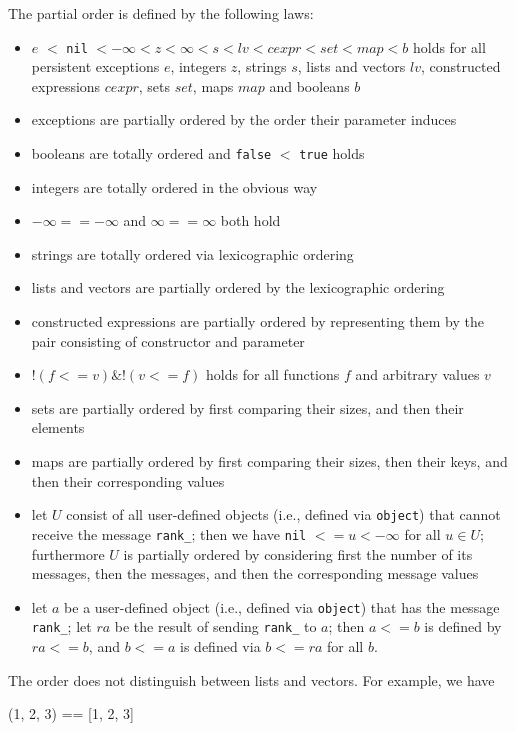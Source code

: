 \documentclass[11pt]{amsart}
\newcommand{\babelsrc}[1] {\lstinline!#1!}
\begin{document}
The partial order is defined by the following laws:
\begin{itemize}
\item  $e$ $<$ \babelsrc{nil} $< -\infty <  z  < \infty < s <  lv < cexpr < set < map < b$ holds for all persistent exceptions $e$, 
 integers $z$, strings $s$,  lists and vectors $lv$,  constructed expressions $cexpr$, sets $set$, maps $map$ and booleans $b$
 \item exceptions are partially ordered by the order their parameter induces
 \item booleans are totally ordered and \babelsrc{false} $<$ \babelsrc{true} holds
 \item integers are totally ordered in the obvious way
 \item $-\infty == -\infty$ and $\infty == \infty$ both hold 
 \item strings are totally ordered via lexicographic ordering
\item lists and vectors are partially ordered by the lexicographic ordering 
\item constructed expressions are partially ordered by representing them by the pair consisting of constructor and parameter
\item $! (f <= v) \& ! (v <= f)$ holds for all functions $f$ and arbitrary values $v$
\item sets are partially ordered by first comparing their sizes, and then their elements 
\item maps are partially ordered by first comparing their sizes, then their keys, and then their corresponding values
\item let $U$ consist of all user-defined objects  (i.e., defined via \babelsrc{object}) that cannot receive the message \texttt{rank\_}; then we have  \babelsrc{nil} $<= u < -\infty$  for all $u \in U$; furthermore $U$ is partially ordered by considering first the number of its messages, then the messages, and then the corresponding message values
\item let $a$ be a user-defined object  (i.e., defined via \babelsrc{object}) that has the message \texttt{rank\_}; let $ra$ be the result of sending  \texttt{rank\_} to $a$; then $a <= b$ is defined by $ra <= b$, and $b <= a$ is defined via $b <= ra$ for all $b$.
\end{itemize}
The order does not distinguish between lists and vectors. For example, we have 
\begin{babellisting}
(1, 2, 3) == [1, 2, 3]
\end{babellisting}
\end{document}
